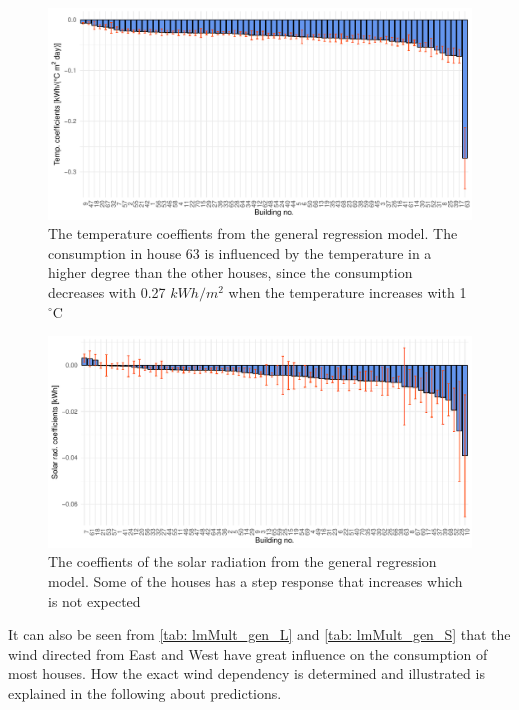 \begin{figure}
    \centering
    \includegraphics[width=1.\textwidth]{../../../figures/Temp_coef.pdf}
    \caption{The temperature coeffients from the general regression model. The consumption in house 63 is influenced by the temperature in a higher degree than the other houses, since the consumption decreases with 0.27 $kWh/m^2$ when the temperature increases with 1 $^{\circ}$C}
    \label{fig: Temp_coef}
\end{figure}
\begin{figure}
    \centering
    \includegraphics[width=1.\textwidth]{../../../figures/Solar_coef.pdf}
    \caption{The coeffients of the solar radiation from the general regression model. Some of the houses has a step response that increases which is not expected}
    \label{fig: Solar_coef}
\end{figure}

\noindent It can also be seen from \cref{tab: lmMult_gen_L} and \cref{tab: lmMult_gen_S} that the wind directed from East and West have great influence on the consumption of most houses. How the exact wind dependency is determined and illustrated is explained in the following about predictions.

